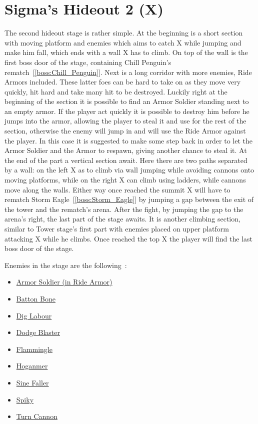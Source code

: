 \section{Sigma's Hideout 2 (X)}
The second hideout stage is rather simple. At the beginning is a short section with moving platform and enemies which aims to catch X while jumping and make him fall, which ends with a wall X has to climb. On top of the wall is the first boss door of the stage, containing Chill Penguin's rematch~[\ref{boss:Chill_Penguin}]. Next is a long corridor with more enemies, Ride Armors included. These latter foes can be hard to take on as they move very quickly, hit hard and take many hit to be destroyed. Luckily right at the beginning of the section it is possible to find an Armor Soldier standing next to an empty armor. If the player act quickly it is possible to destroy him before he jumps into the armor, allowing the player to steal it and use for the rest of the section, otherwise the enemy will jump in and will use the Ride Armor against the player. In this case it is suggested to make some step back in order to let the Armor Soldier and the Armor to respawn, giving another chance to steal it. At the end of the part a vertical section await. Here there are two paths separated by a wall: on the left X as to climb via wall jumping while avoiding cannons onto moving platforms, while on the right X can climb using ladders, while cannons move along the walls. Either way once reached the summit X will have to rematch Storm Eagle~[\ref{boss:Storm_Eagle}] by jumping a gap between the exit of the tower and the rematch's arena. After the fight, by jumping the gap to the arena's right, the last part of the stage awaits. It is another climbing section, similar to Tower stage's first part with enemies placed on upper platform attacking X while he climbs. Once reached the top X the player will find the last boss door of the stage.

Enemies in the stage are the following~\cite{wiki:sigma_stages}:
\begin{itemize}
	\item \hyperlink{enem:Armor_Soldier}{Armor Soldier (in Ride Armor)}
	\item \hyperlink{enem:Batton_Bone}{Batton Bone}
	\item \hyperlink{enem:Dig_Labour}{Dig Labour}
	\item \hyperlink{enem:Dodge_Blaster}{Dodge Blaster}
	\item \hyperlink{enem:Flammingle}{Flammingle}
	\item \hyperlink{enem:Hoganmer}{Hoganmer}
	\item \hyperlink{enem:Sine_Faller}{Sine Faller}
	\item \hyperlink{enem:Spiky}{Spiky}
	\item \hyperlink{enem:Turn_Cannon}{Turn Cannon}
\end{itemize} 

